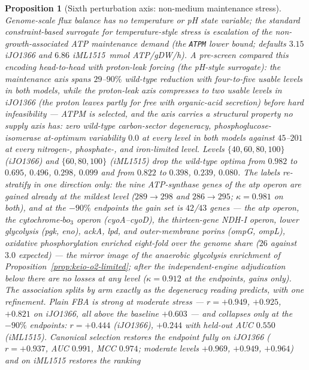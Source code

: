 \documentclass[11pt,a4paper]{article}
\theoremstyle{plain}
\newtheorem{proposition}[theorem]{Proposition}
\theoremstyle{definition}
\theoremstyle{remark}
\begin{document}
\begin{proposition}[Sixth perturbation axis: non-medium
maintenance stress]
\label{prop:keio-atpm}
Genome-scale flux balance has no temperature or pH state variable;
the standard constraint-based surrogate for temperature-style
stress is escalation of the non-growth-associated ATP maintenance
demand (the \texttt{ATPM} lower bound; defaults $3.15$ iJO1366 and
$6.86$ iML1515~mmol ATP/gDW/h). A pre-screen compared this encoding
head-to-head with proton-leak forcing (the pH-style surrogate): the
maintenance axis spans $29$--$90\%$ wild-type reduction with
four-to-five usable levels in both models, while the proton-leak
axis compresses to two usable levels in iJO1366 (the proton leaves
partly for free with organic-acid secretion) before hard
infeasibility --- ATPM is selected, and the axis carries a
structural property no supply axis has: \emph{zero} wild-type
carbon-sector degeneracy, phosphoglucose-isomerase at-optimum
variability $0.0$ at every level in both models against $45$--$201$
at every nitrogen-, phosphate-, and iron-limited level. Levels $\{40,60,80,100\}$ (iJO1366) and
$\{60,80,100\}$ (iML1515) drop the wild-type optima from $0.982$ to
$0.695$, $0.496$, $0.298$, $0.099$ and from $0.822$ to $0.398$,
$0.239$, $0.080$. The labels re-stratify in one direction only:
the nine ATP-synthase genes of the \emph{atp} operon are gained
already at the mildest level ($289\to298$ and $286\to295$;
$\kappa=0.981$ on both), and at the $-90\%$ endpoints the gain set
is $42$/$43$ genes --- the \emph{atp} operon, the
cytochrome-$bo_3$ operon (\emph{cyoA}--\emph{cyoD}), the
thirteen-gene NDH-I operon, lower glycolysis (\emph{pgk},
\emph{eno}), \emph{ackA}, \emph{lpd}, and outer-membrane porins
(\emph{ompG}, \emph{ompL}), oxidative phosphorylation enriched
eight-fold over the genome share ($26$ against $3.0$
expected) --- the mirror image of the anaerobic glycolysis
enrichment of Proposition~\ref{prop:keio-o2-limited}; after the
independent-engine adjudication below there are \emph{no} losses at
any level ($\kappa=0.912$ at the endpoints, gains only). The
association splits by arm exactly as the degeneracy reading
predicts, with one refinement. Plain FBA is \emph{strong at
moderate stress} --- $r=+0.949$, $+0.925$, $+0.821$ on iJO1366, all
above the baseline $+0.603$ --- and collapses only at the $-90\%$
endpoints: $r=+0.444$ (iJO1366), $+0.244$ with held-out AUC
$0.550$ (iML1515). Canonical selection restores the endpoint fully
on iJO1366 ($r=+0.937$, AUC $0.991$, MCC $0.974$; moderate levels
$+0.969$, $+0.949$, $+0.964$) and on iML1515 restores the ranking

\end{proposition}
\end{document}
